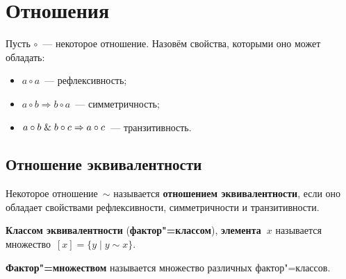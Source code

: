 \section{Отношения}
 Пусть $\circ$~--- некоторое отношение.
Назовём свойства, которыми оно может обладать:
\begin{itemize}
	\item $a \circ a$~--- рефлексивность;
	\item $a \circ b \Rightarrow b \circ a$~--- симметричность;
	\item $a \circ b \mathrel{\&} b \circ c \Rightarrow a \circ c$~--- транзитивность.
\end{itemize}

\subsection{Отношение эквивалентности}
 Некоторое отношение~$\sim$ называется \textbf{отношением эквивалентности}, если оно обладает свойствами рефлексивности, симметричности и транзитивности.

  \textbf{Классом эквивалентности} (\textbf{фактор"=классом}), \textbf{элемента~$x$} называется множество~$[x] = \{ y \mid y \sim x \}$.

 \textbf{Фактор"=множеством} называется множество различных фактор"=классов.